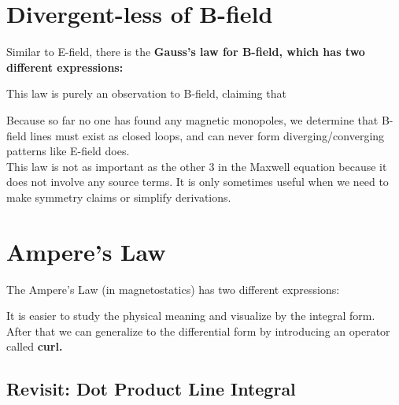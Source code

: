 \documentclass[class=article, crop=false, 12pt]{standalone}
\begin{document}
\linesep
\section{Divergent-less of B-field}

Similar to E-field, there is the \bf{Gauss's law for B-field},
which has two different expressions: 

This law is purely an observation to B-field, claiming that 

Because so far no one has found any magnetic monopoles,
we determine that B-field lines must exist as closed loops,
and can never form diverging/converging patterns like E-field does.\\

This law is not as important as the other 3 in the Maxwell equation because 
it does not involve any source terms.
It is only sometimes useful when we need to make symmetry claims or simplify derivations.



\linesep
\section{Ampere's Law}

The Ampere's Law (in magnetostatics) has two different expressions:

It is easier to study the physical meaning and visualize by the integral form.
After that we can generalize to the differential form by introducing an operator called \bf{curl}.

\subsection{Revisit: Dot Product Line Integral}
\end{document}
